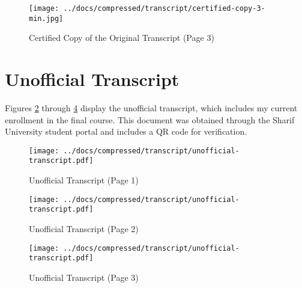 \clearpage

\vspace*{\fill}
\begin{figure}[H]
    \centering
    \texttt{[image: ../docs/compressed/transcript/certified-copy-3-min.jpg]}
    \caption{Certified Copy of the Original Transcript (Page 3)}
    \label{fig:certified-copy-transcript-3}
\end{figure}
\vspace*{\fill}

\clearpage

\section{Unofficial Transcript}\label{sec:unofficial-transcript}

Figures \ref{fig:unofficial-transcript-1} through \ref{fig:unofficial-transcript-3} display the unofficial transcript, which includes my current enrollment in the final course. This document was obtained through the Sharif University student portal and includes a QR code for verification.

\vspace*{\fill}
\begin{figure}[H]
    \centering
    \texttt{[image: ../docs/compressed/transcript/unofficial-transcript.pdf]}
    \caption{Unofficial Transcript (Page 1)}
    \label{fig:unofficial-transcript-1}
\end{figure}
\vspace*{\fill}

\clearpage

\vspace*{\fill}
\begin{figure}[H]
    \centering
    \texttt{[image: ../docs/compressed/transcript/unofficial-transcript.pdf]}
    \caption{Unofficial Transcript (Page 2)}
    \label{fig:unofficial-transcript-2}
\end{figure}
\vspace*{\fill}

\clearpage

\vspace*{\fill}
\begin{figure}[H]
    \centering
    \texttt{[image: ../docs/compressed/transcript/unofficial-transcript.pdf]}
    \caption{Unofficial Transcript (Page 3)}
    \label{fig:unofficial-transcript-3}
\end{figure}
\vspace*{\fill}

\clearpage
